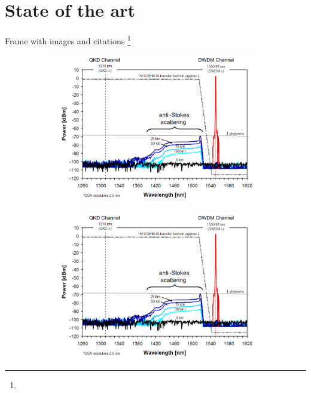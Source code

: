 \documentclass[10pt, 
               aspectratio=169,
               headline=default]{beamer} %
\newcommand\nofoot[1]{%
  \begingroup
  \renewcommand\thefootnote{}\footnote{#1}%
  \addtocounter{footnote}{-1}%
  \endgroup
}
\begin{document}

\section{State of the art}

\begin{frame}{Frame with images and citations}
	\nofoot{}
	\vspace{-20pt}
	\begin{figure}
			\begin{subfigure}{0.55\textwidth}
				\centering
				\includegraphics[width=\textwidth]{example.png}
			\end{subfigure}
			\hspace{10pt}
			\begin{subfigure}{0.40\textwidth}
				\centering
				\includegraphics[width=\textwidth]{example.png}

\end{subfigure}
\end{figure}
\end{frame}
\end{document}
